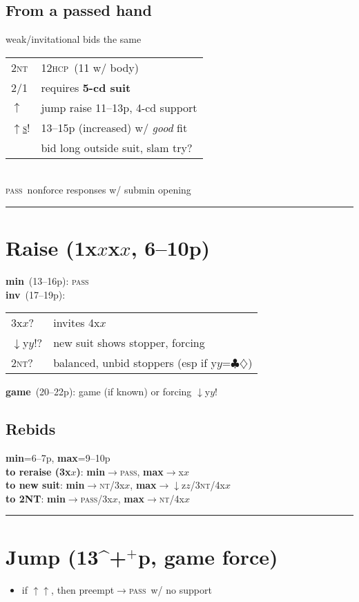 \documentclass[landscape]{article}
\newcommand{\optionalmath}[1]{\ifmmode#1\else$#1$\fi}
\let\mathto\to
\def\to{\optionalmath\mathto}
\def\+{\optionalmath{^+}}
\def\C{\optionalmath\clubsuit}
\def\D{\optionalmath\diamondsuit}
\def\NT{\ifmmode\mathsc{nt}\else\textsc{nt}\fi}
\def\HCP{\textsc{hcp}}
\def\P{\textsc{pass}}
\def\s{\textsc{s}}
\def\x{\optionalmath x}
\def\y{\optionalmath y}
\def\z{\optionalmath z}
\def\ks{\kern2pt\s\kern2pt}
\def\li{\indent\phantom{li}}
\def\force{!}
\def\inv{?}
\def\nojump{\optionalmath\downarrow}
\def\jump{\optionalmath\uparrow}
\def\bmin{\textbf{min}}
\def\binv{\textbf{inv}}
\def\bgame{\textbf{game}}
\def\bmax{\textbf{max}}
\newcommand{\crunch}[1][.6]{\vspace*{-#1pc}}
\renewcommand{\bullet}[1]{\begin{itemize}\item#1\end{itemize}}
\def\unbid#1{\uline{#1}}
\def\raise#1{\uwave{#1}}
\newenvironment{column}[1][0.33]{\begin{minipage}[t]{#1\columnwidth}}{\end{minipage}}
\begin{document}
\begin{column}

\subsection{From a passed hand}
\li weak/invitational bids the same\\
\begin{tabular}{ll}
  2\NT & 12\HCP\ (11 w/ body)\\
  2/1  & requires \textbf{5-cd suit}\\
  \jump\raise{\ks} & jump raise 11--13p, 4-cd support\\
  \jump\unbid\s\force & 13--15p (increased) w/ \emph{good} fit\\
                      & bid long outside suit, slam try?
\end{tabular}\\
\li \P\ nonforce responses w/ submin opening

\crunch[-.6]\hrule\crunch

\section{Raise (1\x-2\x, 6--10p)}
\bmin\ (13--16p): \P\\
\binv\ (17--19p):\\
\begin{tabular}{ll}
  3\x\inv  & invites 4\x\\
  \nojump\y\force\inv & new suit shows stopper, forcing\\
  2\NT\inv & balanced, unbid stoppers (esp if \y=\C\D)\\
\end{tabular}
\bgame\ (20--22p): game (if known) or forcing \nojump\y\force

\crunch[.4]\subsection{Rebids}\crunch[.3]
\bmin=6--7p, \bmax=9--10p\\[6pt]
\textbf{to reraise (3\x)}: \bmin\to\P, \bmax\to4\x\\
\textbf{to new suit}: \bmin\to2\NT/3\x, \bmax\to\nojump\z/3\NT/4\x\\
\textbf{to 2NT}: \bmin\to\P/3\x, \bmax\to3\NT/4\x\\

\crunch[-.6]\hrule\crunch

\section{Jump (13\+p, game force)}
\bullet{if \jump\jump, then preempt\to\P\ w/ no support}


\end{column}
\end{document}
